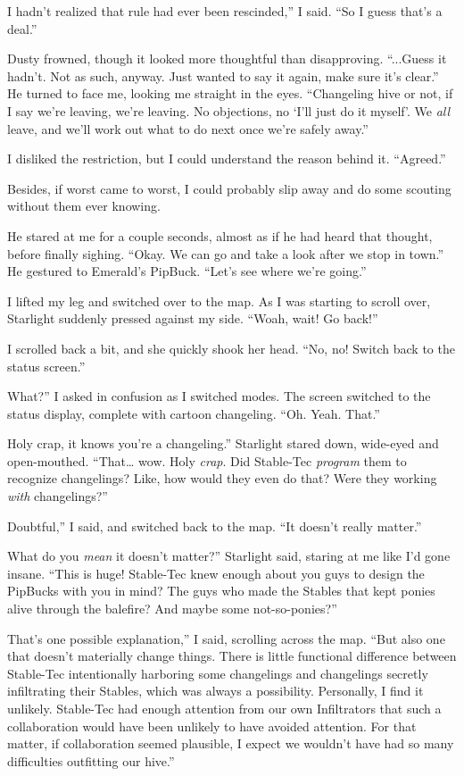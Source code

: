 \leavevmode{}I hadn’t realized that rule had ever been rescinded,” I said. “So I guess that’s a deal.”

Dusty frowned, though it looked more thoughtful than disapproving. “...Guess it hadn’t. Not as such, anyway. Just wanted to say it again, make sure it’s clear.” He turned to face me, looking me straight in the eyes. “Changeling hive or not, if I say we’re leaving, we’re leaving. No objections, no ‘I’ll just do it myself’. We \textit{all} leave, and we’ll work out what to do next once we’re safely away.”

I disliked the restriction, but I could understand the reason behind it. “Agreed.”

Besides, if worst came to worst, I could probably slip away and do some scouting without them ever knowing.

He stared at me for a couple seconds, almost as if he had heard that thought, before finally sighing. “Okay. We can go and take a look after we stop in town.” He gestured to Emerald’s PipBuck. “Let’s see where we’re going.”

I lifted my leg and switched over to the map. As I was starting to scroll over, Starlight suddenly pressed against my side. “Woah, wait! Go back!”

I scrolled back a bit, and she quickly shook her head. “No, no! Switch back to the status screen.”

\leavevmode{}What?” I asked in confusion as I switched modes. The screen switched to the status display, complete with cartoon changeling. “Oh. Yeah. That.”

\leavevmode{}Holy crap, it knows you’re a changeling.” Starlight stared down, wide-eyed and open-mouthed. “That… wow. Holy \textit{crap}. Did Stable-Tec \textit{program} them to recognize changelings? Like, how would they even do that? Were they working \textit{with} changelings?”

\leavevmode{}Doubtful,” I said, and switched back to the map. “It doesn’t really matter.”

\leavevmode{}What do you \textit{mean} it doesn’t matter?” Starlight said, staring at me like I’d gone insane. “This is huge! Stable-Tec knew enough about you guys to design the PipBucks with you in mind? The guys who made the Stables that kept ponies alive through the balefire? And maybe some not-so-ponies?”

\leavevmode{}That’s one possible explanation,” I said, scrolling across the map. “But also one that doesn’t materially change things. There is little functional difference between Stable-Tec intentionally harboring some changelings and changelings secretly infiltrating their Stables, which was always a possibility. Personally, I find it unlikely. Stable-Tec had enough attention from our own Infiltrators that such a collaboration would have been unlikely to have avoided attention. For that matter, if collaboration seemed plausible, I expect we wouldn’t have had so many difficulties outfitting our hive.”

